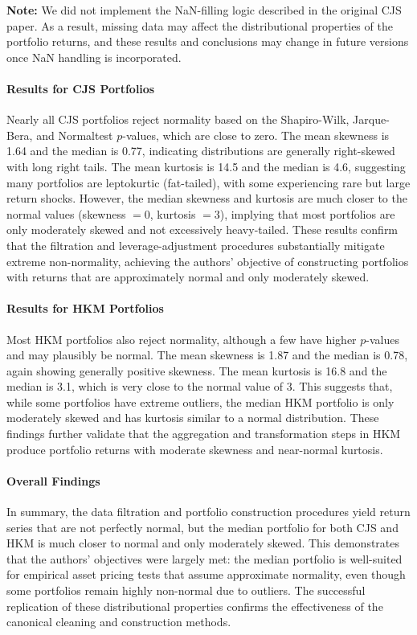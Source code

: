 \documentclass[11pt]{article}
\begin{document}
\textbf{Note:} We did not implement the NaN-filling logic described in the original CJS paper. As a result, missing data may affect the distributional properties of the portfolio returns, and these results and conclusions may change in future versions once NaN handling is incorporated.

\paragraph{Results for CJS Portfolios}

Nearly all CJS portfolios reject normality based on the Shapiro-Wilk, Jarque-Bera, and Normaltest $p$-values, which are close to zero. The mean skewness is 1.64 and the median is 0.77, indicating distributions are generally right-skewed with long right tails. The mean kurtosis is 14.5 and the median is 4.6, suggesting many portfolios are leptokurtic (fat-tailed), with some experiencing rare but large return shocks. However, the median skewness and kurtosis are much closer to the normal values (skewness $=0$, kurtosis $=3$), implying that most portfolios are only moderately skewed and not excessively heavy-tailed. These results confirm that the filtration and leverage-adjustment procedures substantially mitigate extreme non-normality, achieving the authors' objective of constructing portfolios with returns that are approximately normal and only moderately skewed.

\paragraph{Results for HKM Portfolios}
Most HKM portfolios also reject normality, although a few have higher $p$-values and may plausibly be normal. The mean skewness is 1.87 and the median is 0.78, again showing generally positive skewness. The mean kurtosis is 16.8 and the median is 3.1, which is very close to the normal value of 3. This suggests that, while some portfolios have extreme outliers, the median HKM portfolio is only moderately skewed and has kurtosis similar to a normal distribution. These findings further validate that the aggregation and transformation steps in HKM produce portfolio returns with moderate skewness and near-normal kurtosis.

\paragraph{Overall Findings}
In summary, the data filtration and portfolio construction procedures yield return series that are not perfectly normal, but the median portfolio for both CJS and HKM is much closer to normal and only moderately skewed. This demonstrates that the authors' objectives were largely met: the median portfolio is well-suited for empirical asset pricing tests that assume approximate normality, even though some portfolios remain highly non-normal due to outliers. The successful replication of these distributional properties confirms the effectiveness of the canonical cleaning and construction methods.



\end{document}
